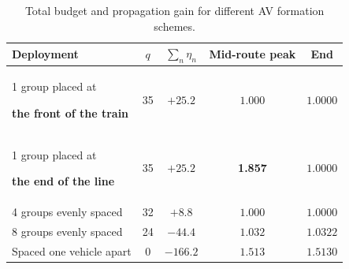 \documentclass[11pt,a4paper,openany]{book}
\numberwithin{equation}{chapter}
\numberwithin{figure}{chapter}
\numberwithin{table}{chapter}
\begin{document}
\begin{table}[htbp]
\centering
\caption{Total budget and propagation gain for different AV formation schemes.}
\label{tab:grouping-alternatives}
\begin{tabular}{lcccc}
\toprule







Deployment




& $q$ & $\sum_n\eta_n$ &




 Mid-route peak




&




 End



\\
\midrule







1 group placed at




\textbf{the front of the train} & 35 & $+25.2$ & $1.000$ & $1.0000$ \\







1 group placed at




\textbf{the end of the line} & 35 & $+25.2$ & \textbf{1.857} & $1.0000$ \\







4 groups evenly spaced




& 32 & $+8.8$ & $1.000$ & $1.0000$ \\







8 groups evenly spaced




& 24 & $-44.4$ & $1.032$ & $1.0322$ \\







Spaced one vehicle apart& 0 & $-166.2$ & $1.513$ & $1.5130$ \\
\bottomrule
\end{tabular}
\end{table}
\end{document}
